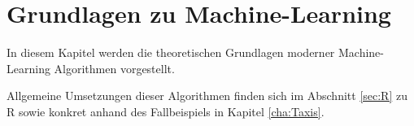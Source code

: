 \chapter{Grundlagen zu Machine-Learning}
\label{cha:MachineLearning}
\label{cha:Theorie}
In diesem Kapitel werden die theoretischen Grundlagen moderner Machine-Learning Algorithmen vorgestellt. 

Allgemeine Umsetzungen dieser Algorithmen finden sich im Abschnitt \ref{sec:R} zu R sowie konkret anhand des Fallbeispiels in Kapitel \ref{cha:Taxis}.



